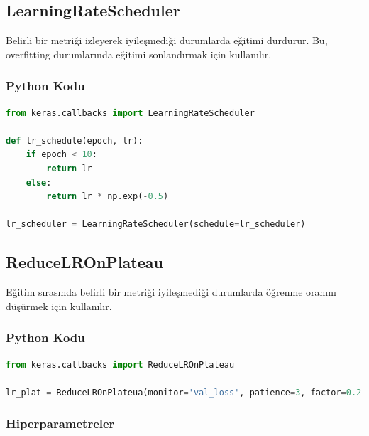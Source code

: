 \newpage

\subsection{LearningRateScheduler}
Belirli bir metriği izleyerek iyileşmediği durumlarda eğitimi durdurur. Bu, overfitting durumlarında eğitimi sonlandırmak için kullanılır.

\subsubsection{Python Kodu}

\begin{lstlisting}[language=Python]
from keras.callbacks import LearningRateScheduler

def lr_schedule(epoch, lr): 
	if epoch < 10:
		return lr
	else:
		return lr * np.exp(-0.5)

lr_scheduler = LearningRateScheduler(schedule=lr_scheduler)
\end{lstlisting}

\newpage

\subsection{ReduceLROnPlateau}
Eğitim sırasında belirli bir metriği iyileşmediği durumlarda öğrenme oranını düşürmek için kullanılır.

\subsubsection{Python Kodu}

\begin{lstlisting}[language=Python]
from keras.callbacks import ReduceLROnPlateau

lr_plat = ReduceLROnPlateua(monitor='val_loss', patience=3, factor=0.2)
\end{lstlisting}

\subsubsection{Hiperparametreler}
\begin{table}[h]
\centering
{\scriptsize\renewcommand{\arraystretch}{0.4}
{}}
\end{table}

